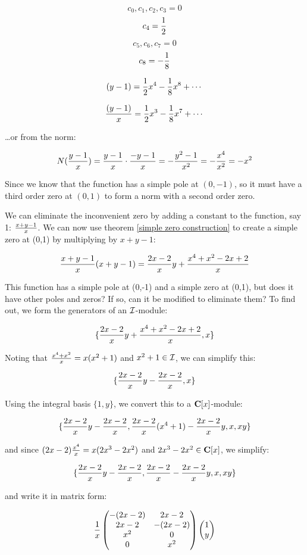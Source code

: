 $$ c_0, c_1, c_2, c_3 = 0 $$
$$ c_4 = {1\over2}$$
$$ c_5, c_6, c_7 = 0 $$
$$ c_8 = -{1\over8} $$

$$ (y-1) = {1\over2} x^4 - {1\over8} x^8 + \cdots$$

$$ {(y-1)\over x} = {1\over2} x^3 - {1\over8} x^7 + \cdots$$

\ldots or from the norm:

$$N({{y-1}\over{x}}) = {{y-1}\over{x}} \cdot {{-y-1}\over{x}} = - {{y^2-1}\over{x^2}} = - {{x^4}\over{x^2}} = - x^2$$

Since we know that the function has a simple pole at $(0,-1)$, so it
must have a third order zero at $(0,1)$ to form a norm with a second
order zero.

We can eliminate the inconvenient zero by adding a constant to the
function, say 1: ${{x+y-1}\over x}$.  We can now use theorem
\ref{simple zero construction} to create a simple zero at
(0,1) by multiplying by $x+y-1$:

$${{x+y-1}\over x} (x+y-1) = {{2x-2}\over x} y + {{x^4+x^2-2x+2}\over x} $$

This function has a simple pole at (0,-1) and a simple zero at (0,1),
but does it have other poles and zeros?  If so, can it be modified to
eliminate them?  To find out, we form the generators of an ${\cal I}$-module:

$$\{ {{2x-2}\over x} y + {{x^4+x^2-2x+2}\over x}, x \}$$

Noting that ${{x^4+x^2}\over{x}} = x(x^2+1)$ and $x^2+1 \in {\cal I}$,
we can simplify this:

$$\{ {{2x-2}\over x} y - {{2x-2}\over x}, x \}$$

\vfill\eject

Using the integral basis $\{1, y \}$, we convert this to a
${\bf C}[x]$-module:

$$\{ {{2x-2}\over x} y - {{2x-2}\over x}, {{2x-2}\over x} (x^4+1) - {{2x-2}\over x} y, x, xy \}$$

and since $(2x-2){{x^4}\over{x}} = x(2x^3-2x^2)$ and
$2x^3-2x^2 \in {\bf C}[x]$, we simplify:

$$\{ {{2x-2}\over x} y - {{2x-2}\over x}, {{2x-2}\over x} - {{2x-2}\over x} y, x, xy \}$$

and write it in matrix form:


$${1\over x}\begin{pmatrix}-(2x-2) & 2x-2 \cr 2x-2 & -(2x-2) \cr x^2 & 0 \cr 0 & x^2\end{pmatrix} \begin{pmatrix}1 \cr y\end{pmatrix}$$

